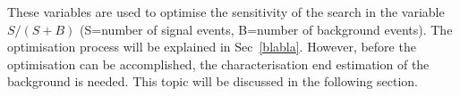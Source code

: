 These variables are used to optimise the sensitivity of the search in the variable $S/(S+B)$ (S=number of signal events, B=number of background events).
The optimisation process will be explained in Sec~\ref{blabla}.
However, before the optimisation can be accomplished, the characterisation end estimation of the background is needed.
This topic will be discussed in the following section.

